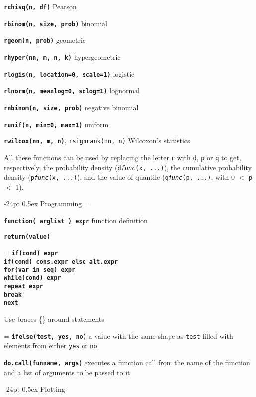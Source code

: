 \documentclass[10pt,landscape]{article}
\makeatletter
\renewcommand\section{\@startsection{section}{1}{0mm}%
                                     {-24pt}%
                                     {0.5ex}%
                                {\color{blue}\normalfont\large\bfseries}}
\newcommand{\code}{\texttt}
\newcommand{\bcode}[1]{\texttt{\textbf{#1}}}
\makeatother
\begin{document}
\begin{multicols*}{3}
\bcode{rchisq(n, df)} Pearson

\bcode{rbinom(n, size, prob)} binomial

\bcode{rgeom(n, prob)} geometric

\bcode{rhyper(nn, m, n, k)} hypergeometric

\bcode{rlogis(n, location=0, scale=1)} logistic

\bcode{rlnorm(n, meanlog=0, sdlog=1)} lognormal

\bcode{rnbinom(n, size, prob)} negative binomial

\bcode{runif(n, min=0, max=1)} uniform

\bcode{rwilcox(nn, m, n)}, \code{rsignrank(nn, n)} Wilcoxon's statistics

All these functions can be used by replacing the letter \code{r} with
\code{d}, \code{p} or \code{q} to get, respectively, the probability
density (\code{d\textsl{func}(x, ...)}), the cumulative probability
density (\code{p\textsl{func}(x, ...)}), and the value of quantile
(\code{q\textsl{func}(p, ...)}, with 0 $<$ \code{p} $<$ 1).

\section{Programming}
\everypar={\hangindent=9mm}

\bcode{function( arglist ) expr} function definition

\bcode{return(value)}

\everypar={\hangindent=0mm}
\bcode{if(cond) expr\\
if(cond) cons.expr  else  alt.expr\\
for(var in seq) expr\\
while(cond) expr\\
repeat expr\\
break\\
next}

Use braces \{\} around statements


\everypar={\hangindent=9mm}
\bcode{ifelse(test, yes, no)} a value with the same shape as
\code{test} filled with elements from either \code{yes} or \code{no}

\bcode{do.call(funname, args)} executes a function call from the name
of the function and a list of arguments to be passed to it

\section{Plotting}


\end{multicols*}
\end{document}
